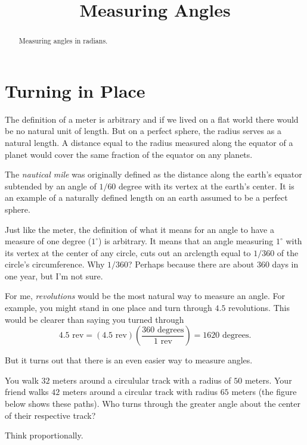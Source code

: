 \documentclass{ximera}
\title{Measuring Angles}
\begin{document}
\begin{abstract}
Measuring angles in radians.
\end{abstract}
\maketitle

\section{Turning in Place}


The definition of a meter is arbitrary and if we lived on a flat world there would be no natural unit of length. But on a perfect sphere, the radius serves as a natural length. A distance equal to the radius measured along the equator of a planet would cover the same fraction of the equator on any planets.

The \emph{nautical mile} was originally defined as the distance along the earth's equator subtended by an angle of $1/60$ degree with its vertex at the earth's center. It is an example of a naturally defined length on an earth assumed to be a perfect sphere.

Just like the meter, the definition of what it means for an angle to have a measure of one degree ($1^\circ$) is arbitrary. It means that an angle measuring $1^\circ$ with its vertex at the center of any circle, cuts out an arclength equal to $1/360$ of the circle's circumference. Why $1/360$? Perhaps because there are about 360 days in one year, but I'm not sure.

For me, \emph{revolutions} would be the most natural way to measure an angle. For example, you might stand in one place and turn through $4.5$ revolutions. This would be clearer than saying you turned through
\[
   4.5 \text{ rev} = (4.5 \text{ rev} ) \left( \frac{360 \text{ degrees}}{1 \text{ rev}} \right) = 1620 \text{ degrees}.
\]

But it turns out that there is an even easier way to measure angles. 

\begin{question}   \label{Q00:Radians}
You walk $32$ meters around a circulular track with a radius of $50$ meters. Your friend walks $42$ meters around a circular track with radius $65$ meters (the figure below shows these paths). Who turns through the greater angle about the center of their respective track?

\begin{hint}
Think proportionally.
\end{hint}

 
\begin{onlineOnly}
    \begin{center}
\end{center}
\end{onlineOnly}

\end{question}
\end{document}
